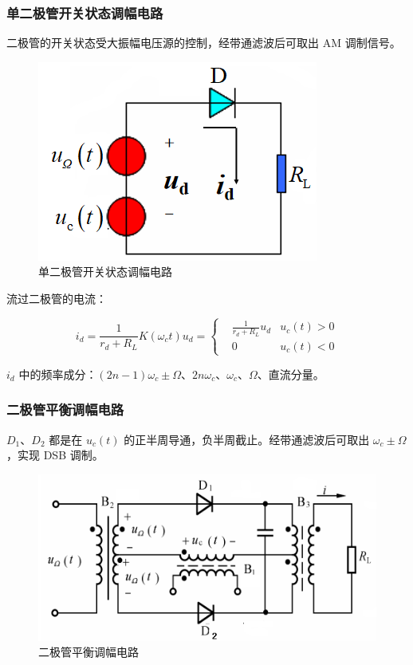 \subsubsection{单二极管开关状态调幅电路}

二极管的开关状态受大振幅电压源的控制，经带通滤波后可取出 AM 调制信号。

\begin{figure}[htbp]
    \centering
    \includegraphics[scale=0.7]{image/Picture11.png}
    \caption{单二极管开关状态调幅电路}
\end{figure}

流过二极管的电流：

\begin{equation}
    i_d = \frac{1}{r_d + R_L} K(\omega_c t) u_d 
    = \left\{
        \begin{aligned}
            & \frac{1}{r_d + R_L} u_d & u_c(t) > 0 \\
            & 0 & u_c(t) < 0
        \end{aligned}
    \right.
\end{equation}

$i_d$ 中的频率成分：$(2n - 1)\omega_c \pm \Omega$、$2n \omega_c$、$\omega_c$、$\Omega$、直流分量。

\subsubsection{二极管平衡调幅电路}

$D_1$、$D_2$ 都是在 $u_c(t)$ 的正半周导通，负半周截止。经带通滤波后可取出 $\omega_c \pm \Omega$，实现 DSB 调制。

\begin{figure}[htbp]
    \centering
    \includegraphics[scale=0.6]{image/Picture12.png}
    \caption{二极管平衡调幅电路}
\end{figure}

